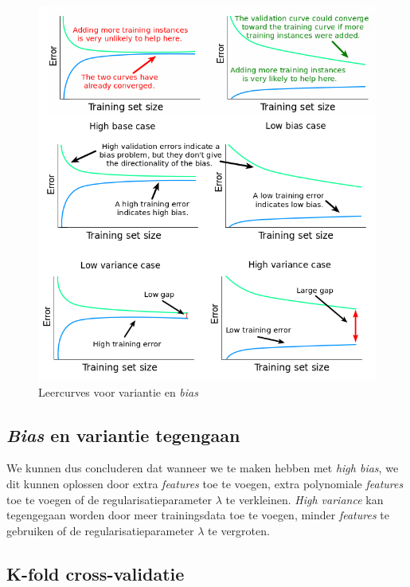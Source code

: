\begin{figure}[h]
	\centering
	\includegraphics[width=0.5\linewidth]{images/20-learning-curves.png}
	\caption{Leercurves voor variantie en \textit{bias}}
	\label{fig:learning-curves}
\end{figure}
\newpage

\subsection{\textit{Bias} en variantie tegengaan}

We kunnen dus concluderen dat wanneer we te maken hebben met \textit{high bias}, we dit kunnen oplossen door extra \textit{features} toe te voegen, extra polynomiale \textit{features} toe te voegen of de regularisatieparameter $\lambda$ te verkleinen. \textit{High variance} kan tegengegaan worden door meer trainingsdata toe te voegen, minder \textit{features} te gebruiken of de regularisatieparameter $\lambda$ te vergroten. 

\subsection{K-fold cross-validatie}


